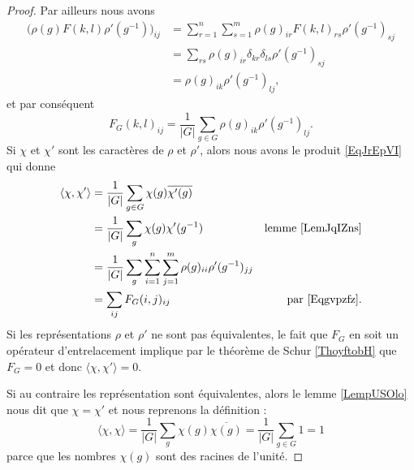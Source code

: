 \begin{proof}
    Par ailleurs nous avons
    \begin{subequations}
        \begin{align}
            \Big( \rho(g)F(k,l)\rho'(g^{-1}) \Big)_{ij}&=\sum_{r=1}^n\sum_{s=1}^m\rho(g)_{ir}F(k,l)_{rs}\rho'(g^{-1})_{sj}\\
            &=\sum_{rs}\rho(g)_{ir}\delta_{kr}\delta_{ls}\rho'(g^{-1})_{sj}\\
            &=\rho(g)_{ik}\rho'(g^{-1})_{lj},
        \end{align}
    \end{subequations}
    et par conséquent
    \begin{equation}    \label{Eqgvpzfz}
        F_G(k,l)_{ij}=\frac{1}{ | G | }\sum_{g\in G}\rho(g)_{ik}\rho'(g^{-1})_{lj}.
    \end{equation}
    Si \( \chi\) et \( \chi'\) sont les caractères de \( \rho\) et \( \rho'\), alors nous avons le produit \eqref{EqJrEpVI} qui donne
    \begin{subequations}
        \begin{align}
            \langle \chi, \chi'\rangle &=\frac{1}{ | G | }\sum_{g\in G}\chi(g)\overline{ \chi'(g) }\\
            &=\frac{1}{ | G | }\sum_g\chi(g)\chi'(g^{-1})    &\text{lemme \ref{LemJqIZns}}\\
            &=\frac{1}{ | G | }\sum_g\sum_{i=1}^n\sum_{j=1}^m\rho(g)_{ii}\rho'(g^{-1})_{jj}     \label{sEqKYywTM}\\
            &=\sum_{ij}F_G(i,j)_{ij}    &\text{par \eqref{Eqgvpzfz}}.
        \end{align}
    \end{subequations}
    Si les représentations \( \rho\) et \( \rho'\) ne sont pas équivalentes, le fait que \( F_G\) en soit un opérateur d'entrelacement implique par le théorème de Schur \ref{ThoyftobH} que \( F_G=0\) et donc \( \langle \chi, \chi'\rangle =0\).

    Si au contraire les représentation sont équivalentes, alors le lemme \ref{LempUSOlo} nous dit que \( \chi=\chi'\) et nous reprenons la définition :
    \begin{equation}
        \langle \chi, \chi\rangle =\frac{1}{ | G | }\sum_g\chi(g)\overline{ \chi(g) }=\frac{1}{ | G | }\sum_{g\in G}1=1
    \end{equation}
    parce que les nombres \( \chi(g)\) sont des racines de l'unité.
\end{proof}


